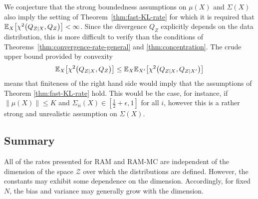 %
%

We conjecture that the strong boundedness assumptions on $\mu(X)$ and $\Sigma(X)$ also imply the setting of Theorem~\ref{thm:fast-KL-rate} for which it is required that $\mathbb{E}_{X}\bigl[\chi^2\bigl(Q_{Z|X}, Q_Z\bigr)\bigr] < \infty$.
Since the divergence $Q_Z$ explicitly depends on the data distribution, this is more difficult to verify than the conditions of Theorems~\ref{thm:convergence-rate-general} and \ref{thm:concentration}.
The crude upper bound provided by convexity
\[
\mathbb{E}_{X}\bigl[\chi^2\bigl(Q_{Z|X}, Q_Z\bigr)\bigr] \leq  \mathbb{E}_{X}\mathbb{E}_{X'}\bigl[\chi^2\bigl(Q_{Z|X}, Q_{Z|X'}\bigr)\bigr]
\]
means that finiteness of the right hand side would imply that the assumptions of Theorem \ref{thm:fast-KL-rate} hold.
This would be the case, for instance, if ${\| \mu(X)\| \leq K}$ and ${\Sigma_{ii}(X) \in [\frac{1}{2}+\epsilon, 1]}$ for all $i$, however this is a rather strong and unrealistic assumption on $\Sigma(X)$.


\subsection{Summary}\label{subsection:discussion-assumptions}
All of the rates presented for RAM and RAM-MC are independent of the dimension of the space $\mathcal{Z}$ over which the distributions are defined.
However, the constants may exhibit some dependence on the dimension.
Accordingly, for fixed $N$, the bias and variance may generally grow with the dimension.



